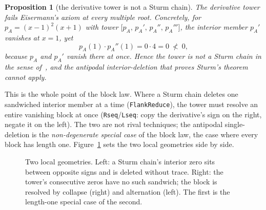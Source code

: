 \documentclass[11pt]{article}
\newtheorem{proposition}{Proposition}
\newcommand{\lean}[1]{\texttt{#1}}
\begin{document}
\begin{proposition}[the derivative tower is not a Sturm chain]\label{prop:notsturm}
The derivative tower fails Eisermann's axiom at every multiple root. Concretely, for
$p_A=(x-1)^2(x+1)$ with tower $\big[p_A,\,p_A',\,p_A'',\,p_A'''\big]$, the interior member $p_A'$
vanishes at $x=1$, yet
\[
  p_A(1)\cdot p_A''(1)=0\cdot4=0\ \not<\ 0,
\]
because $p_A$ and $p_A'$ vanish there \emph{at once}. Hence the tower is not a Sturm chain in the sense
of~\cite{eisermann}, and the antipodal interior-deletion that proves Sturm's theorem cannot apply.
\end{proposition}

This is the whole point of the block law. Where a Sturm chain deletes one sandwiched interior member at
a time (\lean{FlankReduce}), the tower must resolve an entire vanishing block at once
(\lean{Rseq}/\lean{Lseq}: copy the derivative's sign on the right, negate it on the left). The two are
not rival techniques; the antipodal single-deletion is the \emph{non-degenerate special case} of the
block law, the case where every block has length one. Figure~\ref{fig:divide} sets the two local
geometries side by side.

\begin{figure}[htbp]
\centering
{}
\caption{Two local geometries. Left: a Sturm chain's interior zero sits between opposite signs and is
deleted without trace. Right: the tower's consecutive zeros have no such sandwich; the block is
resolved by collapse (right) and alternation (left). The first is the length-one special case of the
second.}
\label{fig:divide}
\end{figure}
\end{document}
